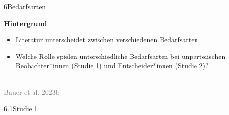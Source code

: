 \documentclass[xcolor=table,9pt,aspectratio=169]{beamer}
\begin{document}
\begin{frame}{\vspace*{10mm}6\hspace*{1em}Bedarfsarten}
\begin{multicols}{2}
   \textbf{Hintergrund}\\
   \medskip
   \begin{itemize}
      \item Literatur unterscheidet zwischen verschiedenen Bedarfsarten
      \item Welche Rolle spielen unterschiedliche Bedarfsarten bei unparteiischen Beobachter*innen (Studie 1) und Entscheider*innen (Studie 2)?
   \end{itemize}
   \vfill
   \begin{center}
      \\
      \textcolor{gray}{Bauer et al. 2023b}
   \end{center}
\end{multicols}
\end{frame}


\begin{frame}
\begin{overlayarea}{\textwidth}{0.81\paperheight}{
   \vspace*{11mm}
   \textcolor{uolblue}
   {6.1\hspace*{1em}Studie 1}
}
\end{overlayarea}
\end{frame}
\end{document}
